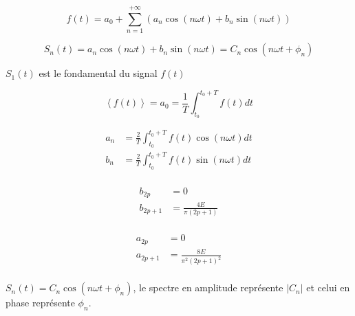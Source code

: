 
\begin{theo}\[
    f(t) = a_0 + \sum_{n=1}^{+\infty} (a_n\cos(n\omega t) + b_n\sin(n\omega t))
\]\end{theo}

\begin{defi}\[
    S_n(t) = a_n\cos(n\omega t) + b_n\sin(n\omega t) = C_n\cos(n\omega t + \phi_n)
\]\end{defi}

\begin{defi}[Fondamental]
    $S_1(t)$ est le fondamental du signal $f(t)$
\end{defi}

\begin{defi}\[
    \left<f(t)\right> = a_0 = \frac{1}{T}\int_{t_0}^{t_0+T}f(t)dt
\]\end{defi}

\begin{lemme}\[
    \begin{split}
        a_n &= \frac{2}{T}\int_{t_0}^{t_0+T} f(t)\cos(n\omega t)dt \\
        b_n &= \frac{2}{T}\int_{t_0}^{t_0+T} f(t)\sin(n\omega t)dt \\
    \end{split}
\]\end{lemme}

\begin{lemme}\[
    \begin{split}
        b_{2p} &= 0 \\
        b_{2p+1} &= \frac{4E}{\pi(2p+1)} \\
    \end{split}
\]\end{lemme}

\begin{lemme}\[
    \begin{split}
        a_{2p} &= 0 \\
        a_{2p+1} &= \frac{8E}{\pi^2(2p+1)^2} \\
    \end{split}
\]\end{lemme}

\begin{defi}
    $S_n(t) = C_n\cos(n\omega t + \phi_n)$, le spectre en amplitude représente $|C_n|$ et celui en phase représente $\phi_n$.
\end{defi}

